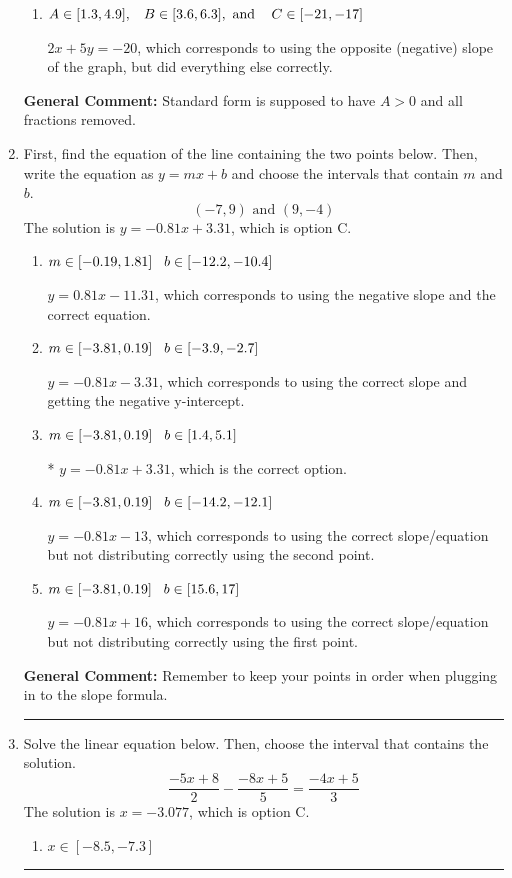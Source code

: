 \documentclass{extbook}[14pt]
\newcommand{\litem}[1]{\item #1

\rule{\textwidth}{0.4pt}}
\begin{document}
\begin{enumerate}
{\begin{enumerate}[label=\Alph*.]
* $2x - 5y = 20$, which is the correct option.
\item \( A \in [1.3, 4.9], \hspace{3mm} B \in [3.6, 6.3], \text{ and } \hspace{3mm} C \in [-21, -17] \)

 $2x + 5y = -20$, which corresponds to using the opposite (negative) slope of the graph, but did everything else correctly.
\end{enumerate}

\textbf{General Comment:} Standard form is supposed to have $A > 0$ and all fractions removed.
}
\litem{
First, find the equation of the line containing the two points below. Then, write the equation as $ y=mx+b $ and choose the intervals that contain $m$ and $b$.
\[ (-7, 9) \text{ and } (9, -4) \]The solution is \( y = -0.81x + 3.31 \), which is option C.\begin{enumerate}[label=\Alph*.]
\item \( m \in [-0.19, 1.81] \hspace*{3mm} b \in [-12.2, -10.4] \)

 $y = 0.81x -11.31$, which corresponds to using the negative slope and the correct equation.
\item \( m \in [-3.81, 0.19] \hspace*{3mm} b \in [-3.9, -2.7] \)

 $y = -0.81x -3.31$, which corresponds to using the correct slope and getting the negative y-intercept.
\item \( m \in [-3.81, 0.19] \hspace*{3mm} b \in [1.4, 5.1] \)

* $y = -0.81x + 3.31$, which is the correct option.
\item \( m \in [-3.81, 0.19] \hspace*{3mm} b \in [-14.2, -12.1] \)

 $y = -0.81x -13$, which corresponds to using the correct slope/equation but not distributing correctly using the second point.
\item \( m \in [-3.81, 0.19] \hspace*{3mm} b \in [15.6, 17] \)

 $y = -0.81x + 16$, which corresponds to using the correct slope/equation but not distributing correctly using the first point.
\end{enumerate}

\textbf{General Comment:} Remember to keep your points in order when plugging in to the slope formula.
}
\litem{
Solve the linear equation below. Then, choose the interval that contains the solution.
\[ \frac{-5x + 8}{2} - \frac{-8x + 5}{5} = \frac{-4x + 5}{3} \]The solution is \( x = -3.077 \), which is option C.\begin{enumerate}[label=\Alph*.]
\item \( x \in [-8.5, -7.3] \)


\end{enumerate}}
\end{enumerate}
\end{document}
